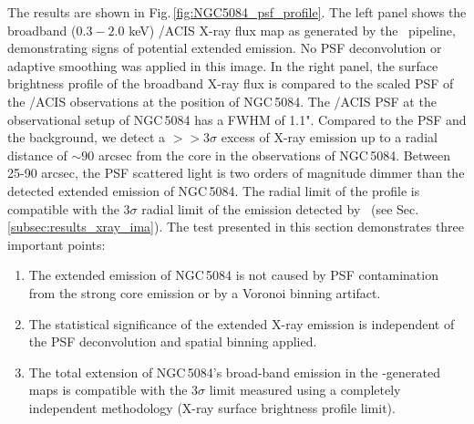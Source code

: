\documentclass[modern]{CORE-AAS/aastex631}
\begin{document}
The results are shown in Fig.\,\ref{fig:NGC5084_psf_profile}. The left panel shows the broadband ($0.3-2.0$ keV) \Chandra/ACIS X-ray flux map as generated by the \ciao\ pipeline, demonstrating signs of potential extended emission. No PSF deconvolution or adaptive smoothing was applied in this image. In the right panel, the surface brightness profile of the broadband X-ray flux is compared to the scaled PSF of the \Chandra/ACIS observations at the position of NGC\,5084. The \Chandra/ACIS PSF at the observational setup of NGC\,5084 has a FWHM of 1.1".
Compared to the PSF and the background, we detect a $>>3\sigma$ excess of X-ray emission up to a radial distance of $\sim90$ arcsec from the core in the observations of NGC\,5084. Between 25-90 arcsec, the PSF scattered light is two orders of magnitude dimmer than the detected extended emission of NGC\,5084. The radial limit of the profile is compatible with the $3\sigma$ radial limit of the emission detected by \SAUNAS\ (see Sec.\,\ref{subsec:results_xray_ima}).
The test presented in this section demonstrates three important points:
\begin{enumerate}
    \item The extended emission of NGC\,5084 is not caused by PSF contamination from the strong core emission or by a Voronoi binning artifact.
    
    \item The statistical significance of the extended X-ray emission is independent of the PSF deconvolution and spatial binning applied.

    \item The total extension of NGC\,5084's broad-band emission in the \SAUNAS-generated maps is compatible with the $3\sigma$ limit measured using a completely independent methodology (X-ray surface brightness profile limit).
\end{enumerate}
\end{document}
